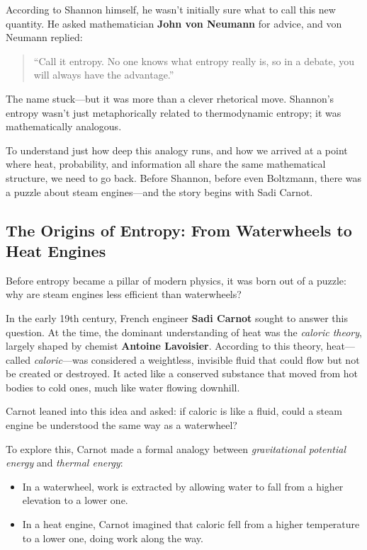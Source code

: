 According to Shannon himself, he wasn’t initially sure what to call this new quantity. He asked mathematician \textbf{John von Neumann} for advice, and von Neumann replied:

\begin{quote}
“Call it entropy. No one knows what entropy really is, so in a debate, you will always have the advantage.”
\end{quote}

The name stuck—but it was more than a clever rhetorical move. Shannon’s entropy wasn’t just metaphorically related to thermodynamic entropy; it was mathematically analogous. 

To understand just how deep this analogy runs, and how we arrived at a point where heat, probability, and information all share the same mathematical structure, we need to go back. Before Shannon, before even Boltzmann, there was a puzzle about steam engines—and the story begins with Sadi Carnot.

\subsection{The Origins of Entropy: From Waterwheels to Heat Engines}

Before entropy became a pillar of modern physics, it was born out of a puzzle: why are steam engines less efficient than waterwheels?

In the early 19th century, French engineer \textbf{Sadi Carnot} sought to answer this question. At the time, the dominant understanding of heat was the \emph{caloric theory}, largely shaped by chemist \textbf{Antoine Lavoisier}. According to this theory, heat—called \emph{caloric}—was considered a weightless, invisible fluid that could flow but not be created or destroyed. It acted like a conserved substance that moved from hot bodies to cold ones, much like water flowing downhill.

Carnot leaned into this idea and asked: if caloric is like a fluid, could a steam engine be understood the same way as a waterwheel?

To explore this, Carnot made a formal analogy between \emph{gravitational potential energy} and \emph{thermal energy}:

\begin{itemize}
  \item In a waterwheel, work is extracted by allowing water to fall from a higher elevation to a lower one.
  \item In a heat engine, Carnot imagined that caloric fell from a higher temperature to a lower one, doing work along the way.
\end{itemize}

